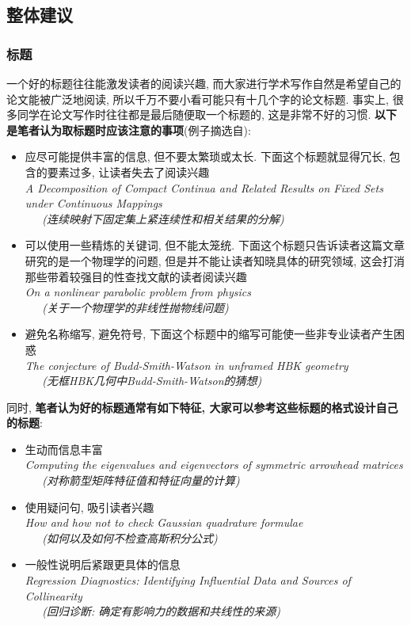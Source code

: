 \documentclass{formatBook}
\begin{document}
\subsection{整体建议}
\subsubsection{标题}
一个好的标题往往能激发读者的阅读兴趣, 而大家进行学术写作自然是希望自己的论文能被广泛地阅读, 所以千万不要小看可能只有十几个字的论文标题. 事实上, 很多同学在论文写作时往往都是最后随便取一个标题的, 这是非常不好的习惯. \textbf{以下是笔者认为取标题时应该注意的事项}(例子摘选自\cite{JungelHow}): 
\begin{itemize}
    \item 应尽可能提供丰富的信息, 但不要太繁琐或太长. 下面这个标题就显得冗长, 包含的要素过多, 让读者失去了阅读兴趣\\
          \textit{A Decomposition of Compact Continua and Related Results on Fixed Sets under Continuous Mappings \\ \ \ \  (连续映射下固定集上紧连续性和相关结果的分解)}
    \item 可以使用一些精炼的关键词, 但不能太笼统. 下面这个标题只告诉读者这篇文章研究的是一个物理学的问题, 但是并不能让读者知晓具体的研究领域, 这会打消那些带着较强目的性查找文献的读者阅读兴趣\\
          \textit{On a nonlinear parabolic problem from physics \\ \ \ \  (关于一个物理学的非线性抛物线问题)}
    \item 避免名称缩写, 避免符号, 下面这个标题中的缩写可能使一些非专业读者产生困惑\\
          \textit{The conjecture of Budd-Smith-Watson in unframed HBK geometry  \\ \ \ \ (无框HBK几何中Budd-Smith-Watson的猜想)}
\end{itemize}
\par
同时, \textbf{笔者认为好的标题通常有如下特征, 大家可以参考这些标题的格式设计自己的标题}: 
\begin{itemize}
    \item 生动而信息丰富\\
          \textit{Computing the eigenvalues and eigenvectors of symmetric arrowhead matrices \\ \ \ \ (对称箭型矩阵特征值和特征向量的计算)}
    \item 使用疑问句, 吸引读者兴趣\\
          \textit{How and how not to check Gaussian quadrature formulae \\ \ \ \ (如何以及如何不检查高斯积分公式)}
    \item 一般性说明后紧跟更具体的信息\\
          \textit{Regression Diagnostics: Identifying Influential Data and Sources of Collinearity \\  \ \ \
              (回归诊断: 确定有影响力的数据和共线性的来源)}
\end{itemize}
\end{document}
